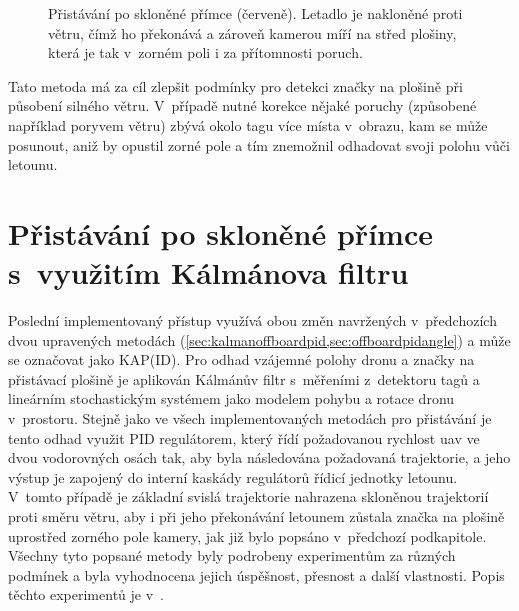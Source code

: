 \begin{figure}
            \caption[Přistávání po skloněné přímce]{Přistávání po skloněné přímce (červeně). Letadlo je nakloněné proti větru, čímž ho překonává a zároveň kamerou míří na střed plošiny, která je tak v~zorném poli i za přítomnosti poruch.}
            \label{fig:offboardpidangle}
        \end{figure}
        

        Tato metoda má za cíl zlepšit podmínky pro detekci značky na plošině při působení silného větru. V~případě nutné korekce nějaké poruchy (způsobené například poryvem větru) zbývá okolo tagu více místa v~obrazu, kam se může posunout, aniž by opustil zorné pole a tím znemožnil odhadovat svoji polohu vůči letounu.
    \section{Přistávání po skloněné přímce s~využitím Kálmánova filtru} \label{sec:kalmanoffboardpidangle}
        Poslední implementovaný přístup využívá obou změn navržených v~předchozích dvou upravených metodách (\cref{sec:kalmanoffboardpid,sec:offboardpidangle}) a může se označovat jako KAP(ID). Pro odhad vzájemné polohy dronu a značky na přistávací plošině je aplikován Kálmánův filtr s~měřeními z~detektoru tagů a lineárním stochastickým systémem jako modelem pohybu a rotace dronu v~prostoru. Stejně jako ve všech implementovaných metodách pro přistávání je tento odhad využit PID regulátorem, který řídí požadovanou rychlost \acrshort{uav} ve dvou vodorovných osách tak, aby byla následována požadovaná trajektorie, a jeho výstup je zapojený do interní kaskády regulátorů řídicí jednotky letounu. V~tomto případě je základní svislá trajektorie nahrazena skloněnou trajektorií proti směru větru, aby i při jeho překonávání letounem zůstala značka na plošině uprostřed zorného pole kamery, jak již bylo popsáno v~předchozí podkapitole. Všechny tyto popsané metody byly podrobeny experimentům za různých podmínek a byla vyhodnocena jejich úspěšnost, přesnost a další vlastnosti. Popis těchto experimentů je v~.